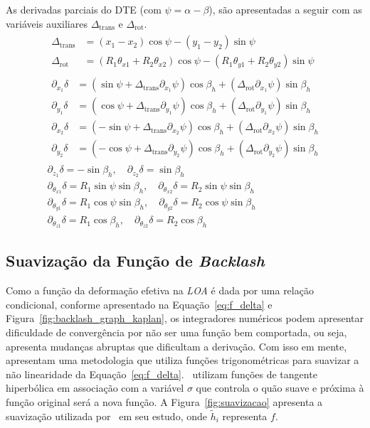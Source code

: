 As derivadas parciais do DTE (com $\psi = \alpha - \beta $), são apresentadas a seguir com as variáveis auxiliares $\Delta_{\text{trans}}$ e $\Delta_{\text{rot}}$.
\begin{gather}
	\begin{aligned}
		\Delta_{\text{trans}} &= (x_1 - x_2) \cos\psi - (y_1 - y_2) \sin\psi \\
		\Delta_{\text{rot}} &= (R_1\theta_{x1} + R_2\theta_{x2}) \cos\psi - (R_1\theta_{y1} + R_2\theta_{y2}) \sin\psi
	\end{aligned}
	\label{eq:delta_aux}
\\
	\begin{aligned}
		\partial_{x_1}\delta &= (\sin\psi + \Delta_{\text{trans}}\partial_{x_1}\psi) \cos\beta_h + (\Delta_{\text{rot}}\partial_{x_1}\psi) \sin\beta_h \\
		\partial_{y_1}\delta &= (\cos\psi + \Delta_{\text{trans}}\partial_{y_1}\psi) \cos\beta_h + (\Delta_{\text{rot}}\partial_{y_1}\psi) \sin\beta_h \\
		\partial_{x_2}\delta &= (-\sin\psi + \Delta_{\text{trans}}\partial_{x_2}\psi) \cos\beta_h + (\Delta_{\text{rot}}\partial_{x_2}\psi) \sin\beta_h \\
		\partial_{y_2}\delta &= (-\cos\psi + \Delta_{\text{trans}}\partial_{y_2}\psi) \cos\beta_h + (\Delta_{\text{rot}}\partial_{y_2}\psi) \sin\beta_h
	\end{aligned}
	\label{eq:ddelta_xy}
\\
	\partial_{z_1}\delta = -\sin\beta_h, \quad \partial_{z_2}\delta = \sin\beta_h
	\label{eq:ddelta_z}
\\
	\partial_{\theta_{x1}}\delta = R_1 \sin\psi \sin\beta_h, \quad \partial_{\theta_{x2}}\delta = R_2 \sin\psi \sin\beta_h
	\label{eq:ddelta_thetax}
\\
	\partial_{\theta_{y1}}\delta = R_1 \cos\psi \sin\beta_h, \quad \partial_{\theta_{y2}}\delta = R_2 \cos\psi \sin\beta_h
	\label{eq:ddelta_thetay}
\\
	\partial_{\theta_{z1}}\delta = R_1 \cos\beta_h, \quad \partial_{\theta_{z2}}\delta = R_2 \cos\beta_h
	\label{eq:ddelta_thetaz}
\end{gather}

\subsection{Suavização da Função de \textit{Backlash}}

Como a função da deformação efetiva na \textit{LOA} é dada por uma relação condicional, conforme apresentado na Equação~\ref{eq:f_delta} e Figura~\ref{fig:backlash_graph_kaplan}, os integradores numéricos podem apresentar dificuldade de convergência por não ser uma função bem comportada, ou seja, apresenta mudanças abruptas que dificultam a derivação.  Com isso em mente,~ apresentam uma metodologia que utiliza funções trigonométricas para suavizar a não linearidade da Equação~\ref{eq:f_delta}.~ utilizam funções de tangente hiperbólica em associação com a variável $\sigma$ que controla o quão suave e próxima à função original será a nova função. A Figura~\ref{fig:suavizacao} apresenta a suavização utilizada por~ em seu estudo, onde ${\tilde{h}}_i$ representa $f$.


